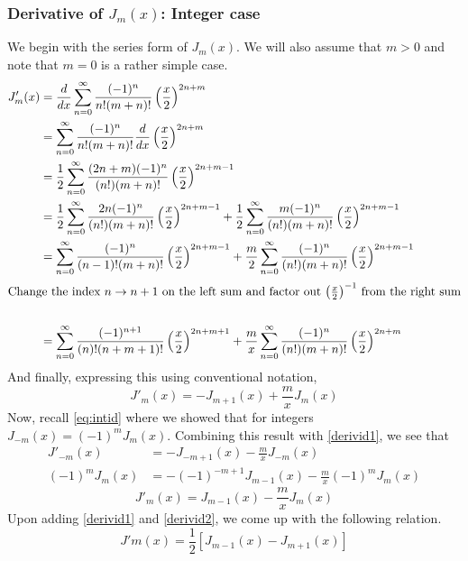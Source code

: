 \documentclass[]{article}
\begin{document}
\subsubsection*{Derivative of $J_m(x)$: Integer case}
We begin with the series form of $J_m(x)$. We will also assume that $m > 0$ and note that $m=0$ is a rather simple case. 
\begin{align*}
	J'_m(x) & = \frac{d}{dx}\sum_{n=0}^{\infty}\frac{(-1)^n}{n!(m+n)!}
		 \left(\frac{x}{2}\right)^{2n+m} \\
	&= \sum_{n=0}^{\infty}\frac{(-1)^n}{n!(m+n)!}
	\frac{d}{dx}\left(\frac{x}{2}\right)^{2n+m} \\
	&=\frac{1}{2}\sum_{n=0}^{\infty}\frac{(2n+m)(-1)^n}{(n!)(m+n)!}
	\left(\frac{x}{2}\right)^{2n+m-1} \\
	&= \frac{1}{2}\sum_{n=0}^{\infty}\frac{2n(-1)^n}{(n!)(m+n)!}
	\left(\frac{x}{2}\right)^{2n+m-1} +
	\frac{1}{2}\sum_{n=0}^{\infty}\frac{m(-1)^n}{(n!)(m+n)!}
	\left(\frac{x}{2}\right)^{2n+m-1} \\
	&= \sum_{n=0}^{\infty}\frac{(-1)^n}{(n-1)!(m+n)!}
	\left(\frac{x}{2}\right)^{2n+m-1} +
	\frac{m}{2}\sum_{n=0}^{\infty}\frac{(-1)^n}{(n!)(m+n)!}
	\left(\frac{x}{2}\right)^{2n+m-1} \\
	\intertext{Change the index $n \to n+1$ on the left sum and factor out $\left(\frac{x}{2}\right)^{-1}$ from the right sum}\\
	&= \sum_{n = 0}^{\infty}\frac{(-1)^{n+1}}{(n)!(n+m+1)!}
	\left(\frac{x}{2}\right)^{2n+m+1} +
	\frac{m}{x}\sum_{n=0}^{\infty}\frac{(-1)^n}{(n!)(m+n)!}
	\left(\frac{x}{2}\right)^{2n+m} \\
\end{align*}
And finally, expressing this using conventional notation, 
\begin{equation} \label{derivid1}
	\boxed{J'_m(x) = -J_{m+1}(x) + \frac{m}{x} J_m(x) }
\end{equation}
Now, recall \eqref{eq:intid} where we showed that for integers $J_{-m}(x) = (-1)^mJ_m(x)$. Combining this result with \eqref{derivid1}, we see that
\begin{align}
	J'_{-m}(x) &= -J_{-m+1}(x) - \frac{m}{x} J_{-m}(x) \nonumber \\
	(-1)^mJ_{m}(x) &= -(-1)^{-m+1}J_{m-1}(x) -\frac{m}{x} (-1)^m J_m(x) \nonumber 
\end{align}
\begin{equation}	\label{derivid2}
	\boxed{ J'_{m}(x) = J_{m-1}(x) -\frac{m}{x} J_m(x)   }
\end{equation}
Upon adding \eqref{derivid1} and \eqref{derivid2}, we come up with the following relation.
\begin{equation} \label{derivid3}
	\boxed{
	J'm(x) = \frac{1}{2}\left[J_{m-1}(x) - J_{m+1}(x) \right]
	}
\end{equation}
\end{document}
